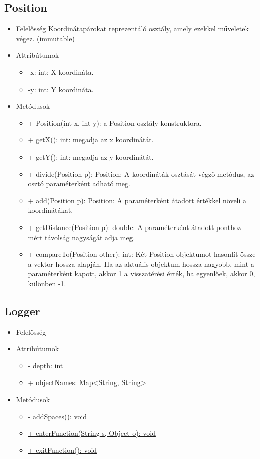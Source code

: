 \subsection{Position}
\begin{itemize}
	\item Felelősség
	Koordinátapárokat reprezentáló osztály, amely ezekkel műveletek végez. (immutable)
	\item Attribútumok
	\begin{itemize}
		\item -x: int: X koordináta.
		\item -y: int: Y koordináta.
	\end{itemize}
	\item Metódusok
	\begin{itemize}
		\item + Position(int x, int y): a Position osztály konstruktora.
		\item + getX(): int: megadja az x koordinátát.
		\item + getY(): int: megadja az y koordinátát.
		\item + divide(Position p): Position: A koordináták osztását végző metódus, az osztó paraméterként adható meg.
		\item + add(Position p): Position: A paraméterként átadott értékkel növeli a koordinátákat.
		\item + getDistance(Position p): double: A paraméterként átadott ponthoz mért távolság nagyságát adja meg.
		\item + compareTo(Position other): int: Két Position objektumot hasonlít össze a vektor hossza alapján. Ha az aktuális objektum hossza nagyobb, mint a paraméterként kapott, akkor 1 a visszatérési érték, ha egyenlőek, akkor 0, különben -1.
	\end{itemize}
\end{itemize}

\subsection{Logger}
\begin{itemize}
	\item Felelősség\newline

	\item Attribútumok\newline
	
	\begin{itemize}
		\item \underline{- depth: int}
		\item \underline{+ objectNames: Map<String, String>}
	\end{itemize}
	\item Metódusok
	\begin{itemize}
		\item \underline{- addSpaces(): void}
		\item \underline{+ enterFunction(String s, Object o): void}
		\item \underline{+ exitFunction(): void}
	\end{itemize}
\end{itemize}

